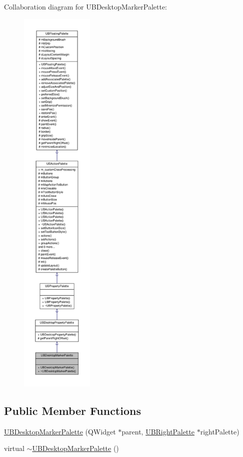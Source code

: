 Collaboration diagram for U\-B\-Desktop\-Marker\-Palette\-:
\nopagebreak
\begin{figure}[H]
\begin{center}
\leavevmode
\includegraphics[height=550pt]{d5/d25/class_u_b_desktop_marker_palette__coll__graph}
\end{center}
\end{figure}
\subsection*{Public Member Functions}
\begin{DoxyCompactItemize}
\item 
\hyperlink{class_u_b_desktop_marker_palette_ab9e24b301b52b1d303e0e9f3915b9ad9}{U\-B\-Desktop\-Marker\-Palette} (Q\-Widget $\ast$parent, \hyperlink{class_u_b_right_palette}{U\-B\-Right\-Palette} $\ast$right\-Palette)
\item 
virtual \hyperlink{class_u_b_desktop_marker_palette_a2c9b0a900d14eaeae27cd72f912a654f}{$\sim$\-U\-B\-Desktop\-Marker\-Palette} ()
\end{DoxyCompactItemize}
